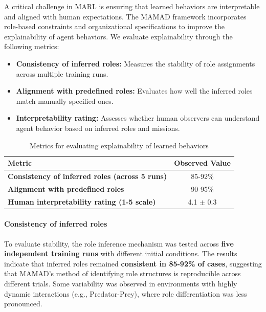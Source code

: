 \documentclass[pdflatex,sn-mathphys-num]{sn-jnl}%
\theoremstyle{thmstyleone}%
\theoremstyle{thmstyletwo}%
\theoremstyle{thmstylethree}%
\begin{document}
A critical challenge in MARL is ensuring that learned behaviors are interpretable and aligned with human expectations. The MAMAD framework incorporates role-based constraints and organizational specifications to improve the explainability of agent behaviors. We evaluate explainability through the following metrics:

\begin{itemize}
    \item \textbf{Consistency of inferred roles:} Measures the stability of role assignments across multiple training runs.
    \item \textbf{Alignment with predefined roles:} Evaluates how well the inferred roles match manually specified ones.
    \item \textbf{Interpretability rating:} Assesses whether human observers can understand agent behavior based on inferred roles and missions.
\end{itemize}

\begin{table}[h!]
    \centering
    \caption{Metrics for evaluating explainability of learned behaviors}
    \begin{tabular}{|l|c|}
        \hline
        \textbf{Metric} & \textbf{Observed Value} \\
        \hline
        \textbf{Consistency of inferred roles (across 5 runs)} & 85-92\% \\
        \hline
        \textbf{Alignment with predefined roles} & 90-95\% \\
        \hline
        \textbf{Human interpretability rating (1-5 scale)} & 4.1 $\pm$ 0.3 \\
        \hline
    \end{tabular}
    \label{tab:explainability}
\end{table}

\paragraph{Consistency of inferred roles} 
To evaluate stability, the role inference mechanism was tested across \textbf{five independent training runs} with different initial conditions. The results indicate that inferred roles remained \textbf{consistent in 85-92\% of cases}, suggesting that MAMAD’s method of identifying role structures is reproducible across different trials. Some variability was observed in environments with highly dynamic interactions (e.g., Predator-Prey), where role differentiation was less pronounced.
\end{document}
